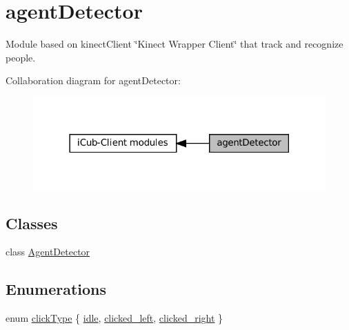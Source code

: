 \hypertarget{group__agentDetector}{}\section{agent\+Detector}
\label{group__agentDetector}


Module based on kinect\+Client \char`\"{}\+Kinect Wrapper Client\char`\"{} that track and recognize people.  


Collaboration diagram for agent\+Detector\+:
\nopagebreak
\begin{figure}[H]
\begin{center}
\leavevmode
\includegraphics[width=318pt]{group__agentDetector}
\end{center}
\end{figure}
\subsection*{Classes}
\begin{DoxyCompactItemize}
\item 
class \hyperlink{group__agentDetector_classAgentDetector}{Agent\+Detector}
\end{DoxyCompactItemize}
\subsection*{Enumerations}
\begin{DoxyCompactItemize}
\item 
enum \hyperlink{group__agentDetector_ga25ebeb7c406dcf4415f5126894542df2}{click\+Type} \{ \newline
\hyperlink{group__agentDetector_gga25ebeb7c406dcf4415f5126894542df2a0e9a37114c0e458d28d52f06ec0f2242}{idle}, 
\newline
\hyperlink{group__agentDetector_gga25ebeb7c406dcf4415f5126894542df2aa478b8b23f59790658a6751a035e5805}{clicked\+\_\+left}, 
\newline
\hyperlink{group__agentDetector_gga25ebeb7c406dcf4415f5126894542df2a86d4d3b99acb8ae2bab34a7f2b426f2f}{clicked\+\_\+right}
 \}
\end{DoxyCompactItemize}


